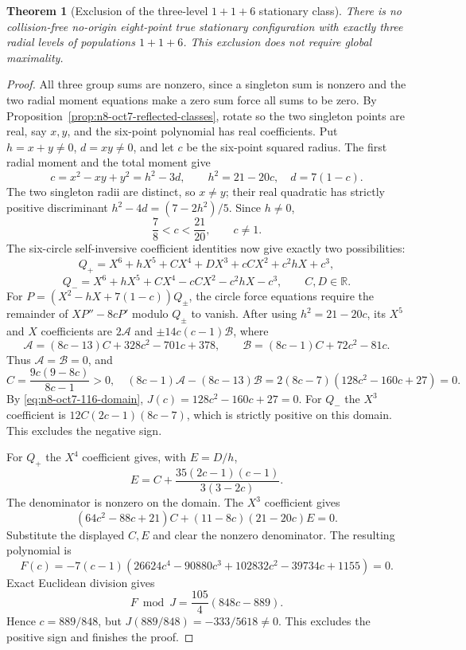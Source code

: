 \documentclass[11pt]{article}
\newtheorem{theorem}{Theorem}[section]
\theoremstyle{remark}
\numberwithin{equation}{section}
\begin{document}
\begin{theorem}[Exclusion of the three-level $1+1+6$ stationary class]
\label{thm:n8-oct7-exclude-116}
There is no collision-free no-origin eight-point true stationary
configuration with exactly three radial levels of populations
$1+1+6$. This exclusion does not require global maximality.
\end{theorem}
\begin{proof}
All three group sums are nonzero, since a singleton sum is nonzero
and the two radial moment equations make a zero sum force all sums
to be zero. By Proposition~\ref{prop:n8-oct7-reflected-classes},
rotate so the two singleton points are real, say $x,y$, and the
six-point polynomial has real coefficients. Put $h=x+y\ne0$,
$d=xy\ne0$, and let $c$ be the six-point squared radius.
The first radial moment and the total moment give
\[
 c=x^2-xy+y^2=h^2-3d,\qquad
                    h^2=21-20c,\quad d=7(1-c).
\]
The two singleton radii are distinct, so $x\ne y$; their real
quadratic has strictly positive discriminant
$h^2-4d=(7-2h^2)/5$. Since $h\ne0$,
\begin{equation}\label{eq:n8-oct7-116-domain}
                         \frac78<c<\frac{21}{20},\qquad c\ne1.
\end{equation}
The six-circle self-inversive coefficient identities now give exactly
two possibilities:
\[
 Q_+=X^6+hX^5+CX^4+DX^3+cCX^2+c^2hX+c^3,
\]
\[
 Q_-=X^6+hX^5+CX^4-cCX^2-c^2hX-c^3,
 \qquad C,D\in\mathbb R.
\]
For $P=(X^2-hX+7(1-c))Q_\pm$, the circle force equations require
the remainder of $XP''-8cP'$ modulo $Q_\pm$ to vanish.
After using $h^2=21-20c$, its $X^5$ and $X$ coefficients are
$2\mathcal A$ and $\pm14c(c-1)\mathcal B$, where
\[
 \mathcal A=(8c-13)C+328c^2-701c+378,
 \qquad \mathcal B=(8c-1)C+72c^2-81c.
\]
Thus $\mathcal A=\mathcal B=0$, and
\[
 C=\frac{9c(9-8c)}{8c-1}>0,
\quad
 (8c-1)\mathcal A-(8c-13)\mathcal B
       =2(8c-7)(128c^2-160c+27)=0.
\]
By \eqref{eq:n8-oct7-116-domain},
$J(c)=128c^2-160c+27=0$.
For $Q_-$ the $X^3$ coefficient is
$12C(2c-1)(8c-7)$, which is strictly positive on this domain.
This excludes the negative sign.

For $Q_+$ the $X^4$ coefficient gives, with $E=D/h$,
\[
 E=C+\frac{35(2c-1)(c-1)}{3(3-2c)}.
\]
The denominator is nonzero on the domain. The $X^3$ coefficient gives
\[
 (64c^2-88c+21)C+(11-8c)(21-20c)E=0.
\]
Substitute the displayed $C,E$ and clear the nonzero denominator.
The resulting polynomial is
\[
 F(c)=-7(c-1)(26624c^4-90880c^3+102832c^2-39734c+1155)=0.
\]
Exact Euclidean division gives
\[
                 F\bmod J=\frac{105}{4}(848c-889).
\]
Hence $c=889/848$, but
$J(889/848)=-333/5618\ne0$. This excludes the positive sign and
finishes the proof.
\end{proof}
\end{document}
